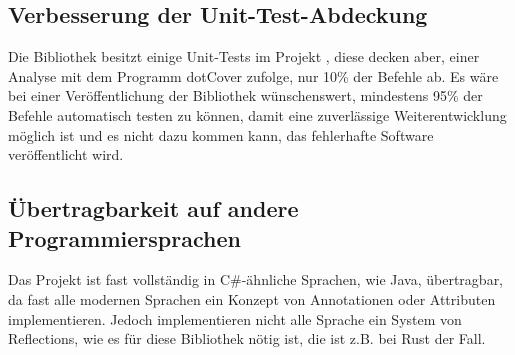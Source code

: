 \subsection{Verbesserung der Unit-Test-Abdeckung}\label{subsec:MoreUnitTests}
Die Bibliothek besitzt einige Unit-Tests im Projekt , diese decken aber, einer Analyse mit dem Programm dotCover zufolge, nur 10\% der Befehle ab.
Es wäre bei einer Veröffentlichung der Bibliothek wünschenswert, mindestens 95\% der Befehle automatisch testen zu können, damit eine zuverlässige Weiterentwicklung möglich ist und es nicht dazu kommen kann, das fehlerhafte Software veröffentlicht wird.
\subsection{Übertragbarkeit auf andere Programmiersprachen}\label{subsec:PortabilityToOtherLangs}
Das Projekt ist fast vollständig in C\#-ähnliche Sprachen, wie Java, übertragbar, da fast alle modernen Sprachen ein Konzept von Annotationen oder Attributen implementieren.
Jedoch implementieren nicht alle Sprache ein System von Reflections, wie es für diese Bibliothek nötig ist, die ist z.B. bei Rust der Fall.
